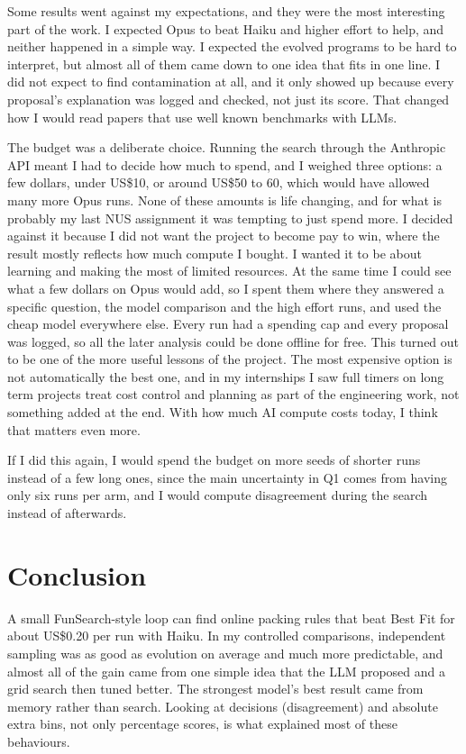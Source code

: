 \documentclass[10pt]{article}
\begin{document}
Some results went against my expectations, and they were the most interesting part of the work.
I expected Opus to beat Haiku and higher effort to help, and neither happened in a simple way. I
expected the evolved programs to be hard to interpret, but almost all of them came down to one idea
that fits in one line. I did not expect to find contamination at all, and it only showed up because
every proposal's explanation was logged and checked, not just its score. That changed how I would read
papers that use well known benchmarks with LLMs.

The budget was a deliberate choice. Running the search through the Anthropic API meant I had to
decide how much to spend, and I weighed three options: a few dollars, under US\$10, or around US\$50 to 60, which would have allowed
many more Opus runs. None of these amounts is life changing, and for what is probably my last NUS
assignment it was tempting to just spend more. I decided against it because I did not want the
project to become pay to win, where the result mostly reflects how much compute I bought. I wanted it
to be about learning and making the most of limited resources. At the same time I could see what a
few dollars on Opus would add, so I spent them where they answered a specific question, the model
comparison and the high effort runs, and used the cheap model everywhere else. Every run had a
spending cap and every proposal was logged, so all the later analysis could be done offline for
free. This turned out to be one of the more useful lessons of the project. The most expensive option
is not automatically the best one, and in my internships I saw full timers on long term projects
treat cost control and planning as part of the engineering work, not something added at the end.
With how much AI compute costs today, I think that matters even more.

If I did this again, I would spend the budget on more seeds of shorter runs instead of a
few long ones, since the main uncertainty in Q1 comes from having only six runs per arm, and I would
compute disagreement during the search instead of afterwards.

\section{Conclusion}
A small FunSearch-style loop can find online packing rules that beat Best Fit for about US\$0.20 per
run with Haiku. In my controlled comparisons, independent sampling was as good as evolution on
average and much more predictable, and almost all of the gain came from one simple idea that the LLM
proposed and a grid search then tuned better. The strongest model's best result came from memory
rather than search. Looking at decisions (disagreement) and absolute extra bins, not only percentage
scores, is what explained most of these behaviours.
\end{document}
